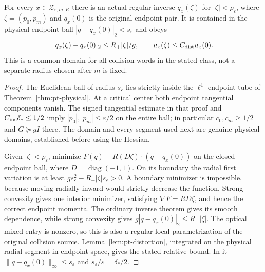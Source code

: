 \begin{lemma}
\label{lem:pt-momentum-disk}
For every $x\in\mathscr Z_{\varepsilon,m,R}$ there is an actual
regular inverse $q_x(\zeta)$ for $|\zeta|<\rho_\varepsilon$,
where $\zeta=(p_0,p_m)$ and $q_x(0)$ is the original endpoint pair.
It is contained in the physical endpoint ball
$|q-q_x(0)|_2<s_\varepsilon$ and obeys
\[
 |q_x(\zeta)-q_x(0)|_2\le R_+|\zeta|/g,
 \qquad u_x(\zeta)\le C_{\rm dist}u_x(0).
\]
This is a common domain for all collision words in the stated class,
not a separate radius chosen after $m$ is fixed.
\end{lemma}
\begin{proof}
The Euclidean ball of radius $s_\varepsilon$ lies strictly inside
the $\ell^1$ endpoint tube of Theorem~\ref{thm:pt-physical}.
At a critical center both endpoint tangential components vanish.
The signed tangential estimate in that proof and
$C_{\rm inc}\delta_*\le1/2$ imply
$|p_0|,|p_m|\le\varepsilon/2$ on the entire ball; in particular
$c_0,c_m\ge1/2$ and $G\succeq gI$ there.  The domain and every
segment used next are genuine physical domains, established before
using the Hessian.

Given $|\zeta|<\rho_\varepsilon$, minimize
$F(q)-R(D\zeta)\cdot(q-q_x(0))$ on the closed endpoint ball,
where $D=\operatorname{diag}(-1,1)$.  On its boundary the radial
first variation is at least
$g s_\varepsilon^2-R_+|\zeta|s_\varepsilon>0$.
A boundary minimizer is impossible, because moving radially inward
would strictly decrease the function.  Strong convexity gives one
interior minimizer, satisfying $\nabla F=RD\zeta$, and hence the
correct endpoint momenta.  The ordinary inverse theorem gives its
smooth dependence, while strong convexity gives
$g|q-q_x(0)|_2\le R_+|\zeta|$.  The optical mixed entry is
nonzero, so this is also a regular local parametrization of the
original collision source.  Lemma~\ref{lem:pt-distortion}, integrated
on the physical radial segment in endpoint space, gives the stated
relative bound.  In it
$\|q-q_x(0)\|_\infty\le s_\varepsilon$ and
$s_\varepsilon/\varepsilon=\delta_*/2$.
\end{proof}


